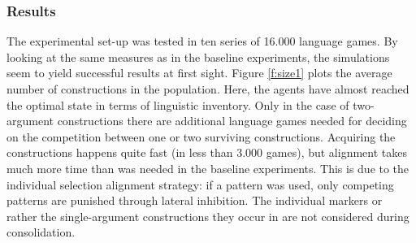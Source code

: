\subsubsection{Results}
 The experimental set-up was tested in ten series of 16.000 language games. By looking at the same measures as in the baseline experiments, the simulations seem to yield successful results at first sight. Figure \ref{f:size1} plots the average number of constructions in the population. Here, the agents have almost reached the optimal state in terms of linguistic inventory. Only in the case of two-argument constructions there are additional language games needed for deciding on the competition between one or two surviving constructions. Acquiring the constructions happens quite fast (in less than 3.000 games), but alignment takes much more time than was needed in the baseline experiments. This is due to the individual selection alignment strategy: if a pattern was used, only competing patterns are punished through lateral inhibition. The individual markers or rather the single-argument constructions they occur in are not considered during consolidation.
